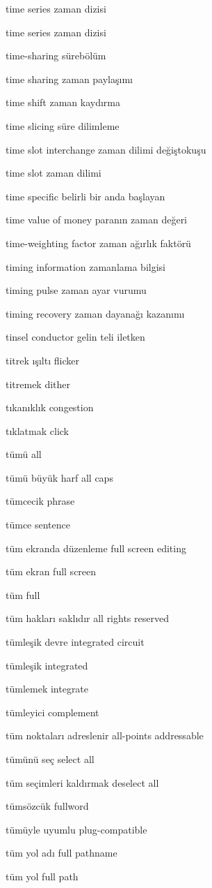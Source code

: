 \documentclass[12pt,fleqn]{article}\usepackage{../../common}
\begin{document}
time series zaman dizisi

time series zaman dizisi

time-sharing sürebölüm

time sharing zaman paylaşımı

time shift zaman kaydırma

time slicing süre dilimleme

time slot interchange zaman dilimi değiştokuşu

time slot zaman dilimi

time specific belirli bir anda başlayan

time value of money paranın zaman değeri

time-weighting factor zaman ağırlık faktörü

timing information zamanlama bilgisi

timing pulse zaman ayar vurumu

timing recovery zaman dayanağı kazanımı

tinsel conductor gelin teli iletken

titrek ışıltı flicker

titremek dither

tıkanıklık congestion

tıklatmak click

tümü all

tümü büyük harf all caps

tümcecik phrase

tümce sentence

tüm ekranda düzenleme full screen editing

tüm ekran full screen

tüm full

tüm hakları saklıdır all rights reserved

tümleşik devre integrated circuit

tümleşik integrated

tümlemek integrate

tümleyici complement

tüm noktaları adreslenir all-points addressable

tümünü seç select all

tüm seçimleri kaldırmak deselect all

tümsözcük fullword

tümüyle uyumlu plug-compatible

tüm yol adı full pathname

tüm yol full path
\end{document}
